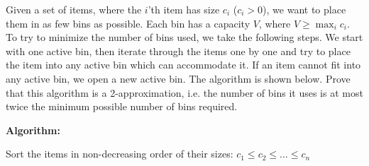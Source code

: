 \problem{}
Given a set of items, where the $i$'th item has size $c_i$ ($c_i > 0$), we want to place them in as few bins as possible.  Each bin has a capacity $V$, where $V \geq \max_i c_i$.  To try to minimize the number of bins used, we take the following steps.  We start with one active bin, then iterate through the items one by one and try to place the item into any active bin which can accommodate it.  If an item cannot fit into any active bin, we open a new active bin. The algorithm is shown below.  Prove that this algorithm is a 2-approximation, i.e. the number of bins it uses is at most twice the minimum possible number of bins required.

\textbf{Algorithm:}

\begin{algorithm}[H]


Sort the items in non-decreasing order of their sizes: $c_1 \leq c_2 \leq \ldots \leq c_n$

\For{$i \leftarrow 1$ \KwTo $n$}{
\For{$j \leftarrow 1$ \KwTo $k$}{
\If{item $i$ fits into active bin $j$}{
place item $i$ in bin $j$

break
}
}
\Else{
open a new active bin $k+1$

$k \gets k+1$

place item $i$ in bin $k+1$;
}
}
\end{algorithm}


\solution{}
 
\newpage